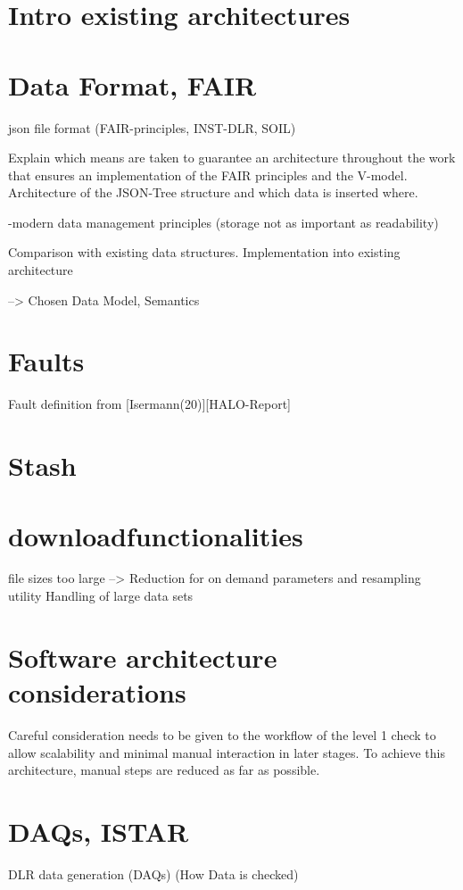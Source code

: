 \section{Intro existing architectures}

\section{Data Format, FAIR}
json file format (FAIR-principles, INST-DLR, SOIL)

Explain which means are taken to guarantee an architecture throughout the work that ensures an implementation of the FAIR principles and the V-model.
Architecture of the JSON-Tree structure and which data is inserted where.


-modern data management principles (storage not as important as readability)

Comparison with existing data structures. Implementation into existing architecture

--> Chosen Data Model, Semantics

\section{Faults}

Fault definition from [Isermann(20)][HALO-Report]

\section{Stash}

\section{downloadfunctionalities}
file sizes too large --> Reduction for on demand parameters and resampling utility
Handling of large data sets


\section{Software architecture considerations}

Careful consideration needs to be given to the workflow of the level 1 check to allow scalability and minimal manual interaction in later stages. To achieve this architecture, manual steps are reduced as far as possible.


\section{DAQs, ISTAR}
    DLR data generation (DAQs) (How Data is checked)

